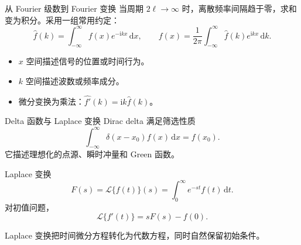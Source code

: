 \begin{frame}{从 Fourier 级数到 Fourier 变换}
  当周期 $2\ell\to\infty$ 时，离散频率间隔趋于零，求和变为积分。采用一组常用约定：
  \[
    \hat f(k)=\int_{-\infty}^{\infty}f(x)e^{-\mathrm{i}kx}\,\mathrm{d}x,
    \qquad
    f(x)=\frac{1}{2\pi}\int_{-\infty}^{\infty}\hat f(k)e^{\mathrm{i}kx}\,\mathrm{d}k.
  \]
  \begin{itemize}
    \item $x$ 空间描述信号的位置或时间行为。
    \item $k$ 空间描述波数或频率成分。
    \item 微分变换为乘法：$\widehat{f'}(k)=\mathrm{i}k\hat f(k)$。
  \end{itemize}
\end{frame}

\begin{frame}{Delta 函数与 Laplace 变换}
  Dirac delta 满足筛选性质
  \[
    \int_{-\infty}^{\infty}\delta(x-x_0)f(x)\,\mathrm{d}x=f(x_0).
  \]
  它描述理想化的点源、瞬时冲量和 Green 函数。
  \begin{block}{Laplace 变换}
    \[
      F(s)=\mathcal{L}\{f(t)\}(s)=\int_0^{\infty}e^{-st}f(t)\,\mathrm{d}t.
    \]
    对初值问题，
    \[
      \mathcal{L}\{f'(t)\}=sF(s)-f(0).
    \]
  \end{block}
  Laplace 变换把时间微分方程转化为代数方程，同时自然保留初始条件。
\end{frame}
